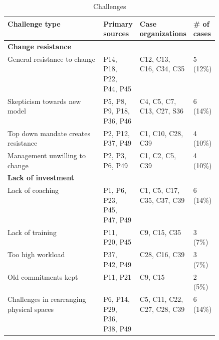 
\begin{table}[tbp]
\caption{Challenges}
\label{tab:challenges}

\begin{centering}
\footnotesize

    \begin{tabularx}{\linewidth}{>{\raggedright\arraybackslash}p{0.49\linewidth}X}

        \toprule
        \textbf{Challenge type}                     & \textbf{Primary sources}                  & \textbf{Case organizations} & \textbf{# of cases}  \\

        \midrule
        \textbf{Change resistance}                  & \\ \addlinespace
        General resistance to change                & P14, P18, P22, P44, P45                   &  C12, C13, C16, C34, C35        & 5 (12\%)  \\ \addlinespace
        Skepticism towards new model                & P5, P8, P9, P18, P36, P46                 &  C4, C5, C7, C13, C27, S36      & 6 (14\%)  \\ \addlinespace
        Top down mandate creates resistance         & P2, P12, P37, P49                         &  C1, C10, C28, C39              & 4 (10\%)  \\ \addlinespace
        Management unwilling to change              & P2, P3, P6, P49                           &  C1, C2, C5, C39                & 4 (10\%)  \\

        \midrule
        \textbf{Lack of investment}                 & \\ \addlinespace
        Lack of coaching                            & P1, P6, P23, P45, P47, P49                &  C1, C5, C17, C35, C37, C39     & 6 (14\%)  \\ \addlinespace
        Lack of training                            & P11, P20, P45                             &  C9, C15, C35                   & 3 (7\%)   \\ \addlinespace
        Too high workload                           & P37, P42, P49                             &  C28, C16, C39                  & 3 (7\%)   \\ \addlinespace
        Old commitments kept                        & P11, P21                                  &  C9, C15                        & 2 (5\%)   \\ \addlinespace
        Challenges in rearranging physical spaces   & P6, P14, P29, P36, P38, P49               &  C5, C11, C22, C27, C28, C39    & 6 (14\%)  \\


\end{tabularx}
\end{centering}
\end{table}
